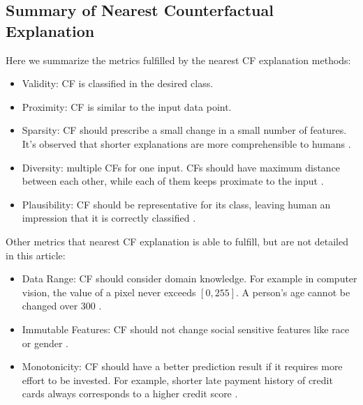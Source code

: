 \subsection{Summary of Nearest Counterfactual Explanation}
Here we summarize the metrics fulfilled by the nearest CF explanation methods:
 \begin{itemize}
 \item Validity: CF is classified in the desired class.
 \item Proximity: CF is similar to the input data point.
   \item  Sparsity: CF should prescribe a small change in a small number of features. It's observed that shorter explanations are more comprehensible to humans \cite{CFReview}. %
   \item  Diversity: multiple CFs for one input. CFs should have maximum distance between each other, while each of them keeps proximate to the input \cite{russellDiverse,DiCE,certifai}.
   \item  Plausibility: CF should be representative for its class, leaving human an impression that it is correctly classified \cite{prototype,FACE}.
 \end{itemize}
 Other metrics that nearest CF explanation is able to fulfill, but are not detailed in this article:
 \begin{itemize}
   \item Data Range: CF should consider domain knowledge. For example in computer vision, the value of a pixel never exceeds $[0,255]$. A person's age cannot be changed over 300 \cite{certifai}.
   \item Immutable Features: CF should not change social sensitive features like race or gender \cite{certifai}.
   \item Monotonicity: CF should have a better prediction result if it requires more effort to be invested. For example, shorter late payment history of credit cards always corresponds to a higher credit score \cite{russellDiverse}.
 \end{itemize}
